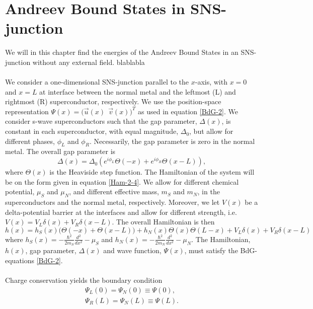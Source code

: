 \chapter{Andreev Bound States in SNS-junction}
We will in this chapter find the energies of the Andreev Bound States in an SNS-junction without any external field. blablabla
\\
\\
We consider a one-dimensional SNS-junction parallel to the $x$-axis, with $x=0$ and $x=L$ at interface between the normal metal and the leftmost (L) and rightmost (R) superconductor, respectively. We use the position-space representation $\Psi(x) = \big(\vec{u}(x) \ \ \vec{v}(x) \big)^T$ as used in equation \eqref{BdG-2}. We consider s-wave superconductors such that the gap parameter, $\Delta(x)$, is constant in each superconductor, with equal magnitude, $\Delta_0$, but allow for different phases, $\phi_L$ and $\phi_R$. Necessarily, the gap parameter is zero in the normal metal. The overall gap parameter is
\begin{equation}
    \Delta(x) = \Delta_0\left( e^{i\phi_L}\Theta(-x) + e^{i\phi_R}\Theta(x-L)\right),
\end{equation}
where $\Theta(x)$ is the Heaviside step function. 
The Hamiltonian of the system will be on the form given in equation \eqref{Ham-2-4}. We allow for different chemical potential, $\mu_S$ and $\mu_N$, and different effective mass, $m_S$ and $m_N$, in the superconductors and the normal metal, respectively. Moreover, we let $V(x)$ be a delta-potential barrier at the interfaces and allow for different strength, i.e. $V(x) = V_L\delta(x) + V_R\delta(x-L)$. The overall Hamiltonian is then
\begin{equation}
    h(x) = h_S(x)\big(\Theta(-x) + \Theta(x-L) \big) + h_N(x)\Theta(x)\Theta(L-x) + V_L\delta(x) + V_R\delta(x-L)
\end{equation}
where $h_S(x) = -\frac{\hbar^2}{2m_S}\frac{d^2}{dx^2}-\mu_S$ and $h_N(x) = -\frac{\hbar^2}{2m_N}\frac{d^2}{dx^2}-\mu_N$. The Hamiltonian, $h(x)$, gap parameter, $\Delta(x)$ and wave function, $\Psi(x)$, must satisfy the BdG-equations \eqref{BdG-2}.
\\
\\
Charge conservation yields the boundary condition
\begin{equation}
\begin{split}
    \Psi_L(0) = \Psi_N(0) \equiv \Psi(0),\\
    \Psi_R(L) = \Psi_N(L) \equiv \Psi(L).
\end{split}
\end{equation}
